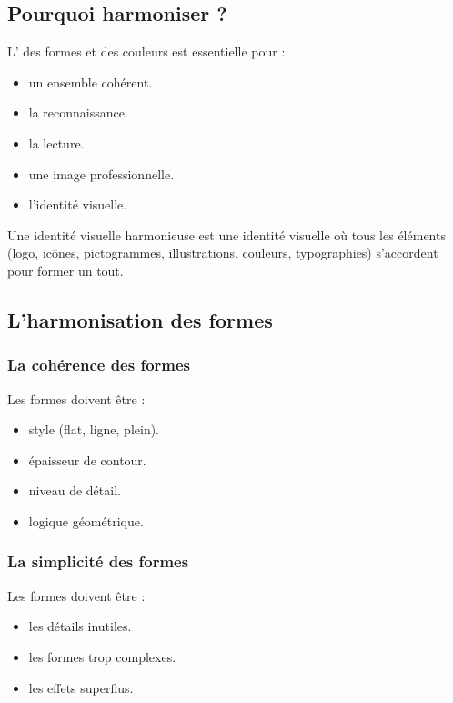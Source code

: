 \subsection{Pourquoi harmoniser ?}

L' des formes et des couleurs est essentielle pour :

\begin{itemize}
    \item {} un ensemble cohérent.
    \item {} la reconnaissance.
    \item {} la lecture.
    \item {} une image professionnelle.
    \item {} l'identité visuelle.
\end{itemize}

Une identité visuelle harmonieuse est une identité visuelle où tous les éléments (logo, icônes, pictogrammes, illustrations, couleurs, typographies) s'accordent pour former un tout.

\subsection{L'harmonisation des formes}

\subsubsection{La cohérence des formes}

Les formes doivent être  :

\begin{itemize}
    \item {} style (flat, ligne, plein).
    \item {} épaisseur de contour.
    \item {} niveau de détail.
    \item {} logique géométrique.
\end{itemize}

\subsubsection{La simplicité des formes}

Les formes doivent être  :

\begin{itemize}
    \item {} les détails inutiles.
    \item {} les formes trop complexes.
    \item {} les effets superflus.
\end{itemize}


